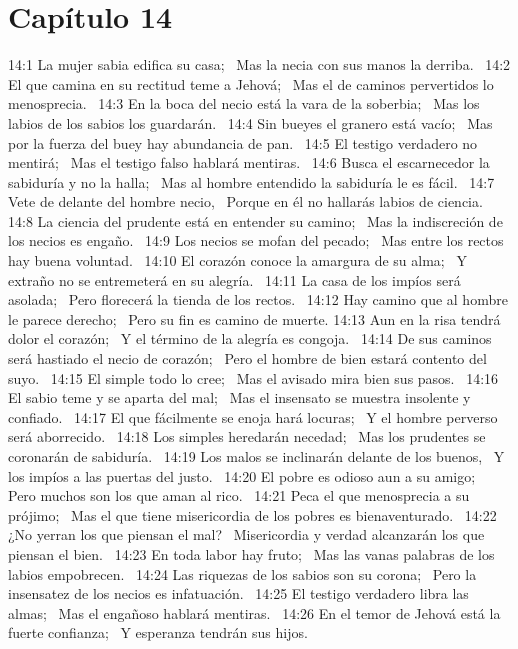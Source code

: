 \section*{Capítulo 14 }

14:1 La mujer sabia edifica su casa;  
Mas la necia con sus manos la derriba.  
14:2 El que camina en su rectitud teme a Jehová;  
Mas el de caminos pervertidos lo menosprecia.  
14:3 En la boca del necio está la vara de la soberbia;  
Mas los labios de los sabios los guardarán.  
14:4 Sin bueyes el granero está vacío;  
Mas por la fuerza del buey hay abundancia de pan.  
14:5 El testigo verdadero no mentirá;  
Mas el testigo falso hablará mentiras.  
14:6 Busca el escarnecedor la sabiduría y no la halla;  
Mas al hombre entendido la sabiduría le es fácil.  
14:7 Vete de delante del hombre necio,  
Porque en él no hallarás labios de ciencia.  
14:8 La ciencia del prudente está en entender su camino;  
Mas la indiscreción de los necios es engaño.  
14:9 Los necios se mofan del pecado;  
Mas entre los rectos hay buena voluntad.  
14:10 El corazón conoce la amargura de su alma;  
Y extraño no se entremeterá en su alegría.  
14:11 La casa de los impíos será asolada;  
Pero florecerá la tienda de los rectos.  
14:12 Hay camino que al hombre le parece derecho;  
Pero su fin es camino de muerte. 
14:13 Aun en la risa tendrá dolor el corazón;  
Y el término de la alegría es congoja.  
14:14 De sus caminos será hastiado el necio de corazón;  
Pero el hombre de bien estará contento del suyo.  
14:15 El simple todo lo cree;  
Mas el avisado mira bien sus pasos.  
14:16 El sabio teme y se aparta del mal;  
Mas el insensato se muestra insolente y confiado.  
14:17 El que fácilmente se enoja hará locuras;  
Y el hombre perverso será aborrecido.  
14:18 Los simples heredarán necedad;  
Mas los prudentes se coronarán de sabiduría.  
14:19 Los malos se inclinarán delante de los buenos,  
Y los impíos a las puertas del justo.  
14:20 El pobre es odioso aun a su amigo;  
Pero muchos son los que aman al rico.  
14:21 Peca el que menosprecia a su prójimo;  
Mas el que tiene misericordia de los pobres es bienaventurado.  
14:22 ¿No yerran los que piensan el mal?  
Misericordia y verdad alcanzarán los que piensan el bien.  
14:23 En toda labor hay fruto;  
Mas las vanas palabras de los labios empobrecen.  
14:24 Las riquezas de los sabios son su corona;  
Pero la insensatez de los necios es infatuación.  
14:25 El testigo verdadero libra las almas;  
Mas el engañoso hablará mentiras.  
14:26 En el temor de Jehová está la fuerte confianza;  
Y esperanza tendrán sus hijos.  
